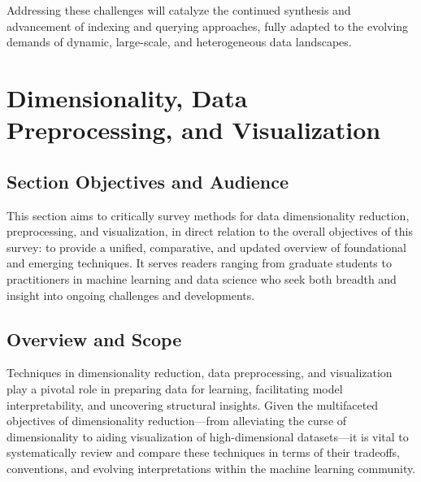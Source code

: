 \documentclass[sigconf]{acmart}
\begin{document}
Addressing these challenges will catalyze the continued synthesis and advancement of indexing and querying approaches, fully adapted to the evolving demands of dynamic, large-scale, and heterogeneous data landscapes.

\section{Dimensionality, Data Preprocessing, and Visualization}

\subsection*{Section Objectives and Audience}
This section aims to critically survey methods for data dimensionality reduction, preprocessing, and visualization, in direct relation to the overall objectives of this survey: to provide a unified, comparative, and updated overview of foundational and emerging techniques. It serves readers ranging from graduate students to practitioners in machine learning and data science who seek both breadth and insight into ongoing challenges and developments.

\subsection*{Overview and Scope}
Techniques in dimensionality reduction, data preprocessing, and visualization play a pivotal role in preparing data for learning, facilitating model interpretability, and uncovering structural insights. Given the multifaceted objectives of dimensionality reduction---from alleviating the curse of dimensionality to aiding visualization of high-dimensional datasets---it is vital to systematically review and compare these techniques in terms of their tradeoffs, conventions, and evolving interpretations within the machine learning community.
\end{document}
